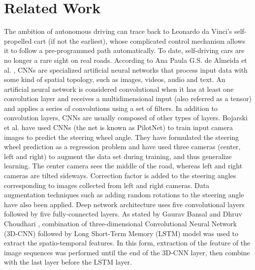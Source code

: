 \documentclass[10pt,twocolumn,letterpaper]{article}
\begin{document}
\section{Related Work}
The ambition of autonomous driving can trace back to Leonardo da Vinci's self-propelled cart (if not the earliest), whose complicated control mechanism allows it to follow a pre-programmed path automatically. To date, self-driving cars are no longer a rare sight on real roads. According to Ana Paula G.S. de Almeida et al. \cite{Alpher05}, CNNs are specialized artificial neural networks that process input data with some kind of spatial topology, such as images, videos, audio and text. An artificial neural network is considered convolutional when it has at least one convolution layer and receives a multidimensional input (also referred as a tensor) and applies a series of convolutions using a set of filters. In addition to convolution layers, CNNs are usually composed of other types of layers. Bojarski et al. \cite{Alpher03} have used CNNs (the net is known as PilotNet) to train input camera images to predict the steering wheel angle. They have formulated the steering wheel prediction as a regression problem and have used three cameras (center, left and right) to augment the data set during training, and thus generalize learning. The center camera sees the middle of the road, whereas left and right cameras are tilted sideways. Correction factor is added to the steering angles corresponding to images collected from left and right cameras. Data augmentation techniques such as adding random rotations to the steering angle have also been applied. Deep network architecture uses five convolutional layers followed by five fully-connected layers. As stated by Gaurav Bansal and Dhruv Choudhari \cite{Alpher02}, combination of three-dimensional Convolutional Neural Network (3D-CNN) followed by Long Short-Term Memory (LSTM) model was used to extract the spatio-temporal features. In this form, extraction  of the feature of the image sequences was performed until the end of the 3D-CNN layer, then combine with the last layer before the LSTM layer.
\end{document}
